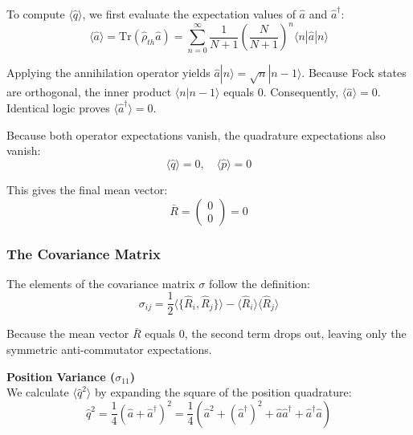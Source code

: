 {To compute $\langle\hat{q}\rangle$, we first evaluate the expectation values of $\hat{a}$ and $\hat{a}^{\dagger}$:
\begin{equation*}
    \langle\hat{a}\rangle = \text{Tr}(\hat{\rho}_{th}\hat{a}) = \sum_{n=0}^{\infty} \frac{1}{N+1}\left(\frac{N}{N+1}\right)^n \langle n|\hat{a}|n\rangle
\end{equation*}

Applying the annihilation operator yields $\hat{a}|n\rangle = \sqrt{n}|n-1\rangle$. Because Fock states are orthogonal, the inner product $\langle n | n-1 \rangle$ equals $0$. Consequently, $\langle\hat{a}\rangle = 0$. Identical logic proves $\langle\hat{a}^{\dagger}\rangle = 0$.

Because both operator expectations vanish, the quadrature expectations also vanish:
\begin{equation*}
    \langle\hat{q}\rangle = 0, \quad \langle\hat{p}\rangle = 0
\end{equation*}

This gives the final mean vector:
\begin{equation}
    \bar{R} = \begin{pmatrix} 0 \\ 0 \end{pmatrix} = 0
    \label{eq:eq296a}
\end{equation}

\subsubsection{The Covariance Matrix}
The elements of the covariance matrix $\sigma$ follow the definition:
\begin{equation*}
    \sigma_{ij} = \frac{1}{2}\langle\{\hat{R}_i, \hat{R}_j\}\rangle - \langle\hat{R}_i\rangle\langle\hat{R}_j\rangle
\end{equation*}

Because the mean vector $\bar{R}$ equals $0$, the second term drops out, leaving only the symmetric anti-commutator expectations.

\textbf{Position Variance ($\sigma_{11}$)} \\
We calculate $\langle\hat{q}^2\rangle$ by expanding the square of the position quadrature:
\begin{equation*}
    \hat{q}^2 = \frac{1}{4}\left(\hat{a} + \hat{a}^{\dagger}\right)^2 = \frac{1}{4}\left(\hat{a}^2 + (\hat{a}^{\dagger})^2 + \hat{a}\hat{a}^{\dagger} + \hat{a}^{\dagger}\hat{a}\right)
\end{equation*}

}
